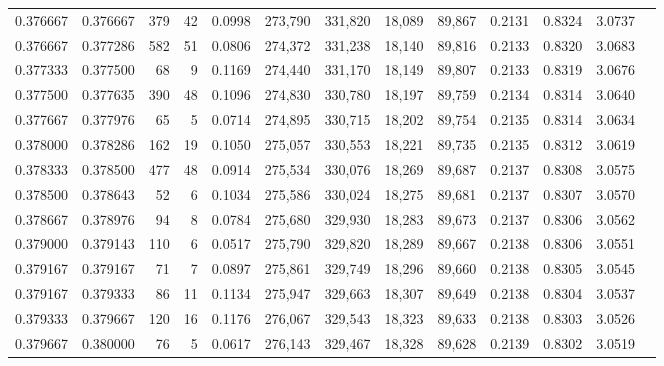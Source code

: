 \begin{tabular}{rrrrrrrrrrrrr}
0.376667 & 0.376667 &   379 &  42 &                                     0.0998 & 273,790 & 331,820 &  18,089 &  89,867 & 0.2131 & 0.8324 & 3.0737 \\
0.376667 & 0.377286 &   582 &  51 &                                     0.0806 & 274,372 & 331,238 &  18,140 &  89,816 & 0.2133 & 0.8320 & 3.0683 \\
0.377333 & 0.377500 &    68 &   9 &                                     0.1169 & 274,440 & 331,170 &  18,149 &  89,807 & 0.2133 & 0.8319 & 3.0676 \\
0.377500 & 0.377635 &   390 &  48 &                                     0.1096 & 274,830 & 330,780 &  18,197 &  89,759 & 0.2134 & 0.8314 & 3.0640 \\
0.377667 & 0.377976 &    65 &   5 &                                     0.0714 & 274,895 & 330,715 &  18,202 &  89,754 & 0.2135 & 0.8314 & 3.0634 \\
0.378000 & 0.378286 &   162 &  19 &                                     0.1050 & 275,057 & 330,553 &  18,221 &  89,735 & 0.2135 & 0.8312 & 3.0619 \\
0.378333 & 0.378500 &   477 &  48 &                                     0.0914 & 275,534 & 330,076 &  18,269 &  89,687 & 0.2137 & 0.8308 & 3.0575 \\
0.378500 & 0.378643 &    52 &   6 &                                     0.1034 & 275,586 & 330,024 &  18,275 &  89,681 & 0.2137 & 0.8307 & 3.0570 \\
0.378667 & 0.378976 &    94 &   8 &                                     0.0784 & 275,680 & 329,930 &  18,283 &  89,673 & 0.2137 & 0.8306 & 3.0562 \\
0.379000 & 0.379143 &   110 &   6 &                                     0.0517 & 275,790 & 329,820 &  18,289 &  89,667 & 0.2138 & 0.8306 & 3.0551 \\
0.379167 & 0.379167 &    71 &   7 &                                     0.0897 & 275,861 & 329,749 &  18,296 &  89,660 & 0.2138 & 0.8305 & 3.0545 \\
0.379167 & 0.379333 &    86 &  11 &                                     0.1134 & 275,947 & 329,663 &  18,307 &  89,649 & 0.2138 & 0.8304 & 3.0537 \\
0.379333 & 0.379667 &   120 &  16 &                                     0.1176 & 276,067 & 329,543 &  18,323 &  89,633 & 0.2138 & 0.8303 & 3.0526 \\
0.379667 & 0.380000 &    76 &   5 &                                     0.0617 & 276,143 & 329,467 &  18,328 &  89,628 & 0.2139 & 0.8302 & 3.0519 \\

\end{tabular}
